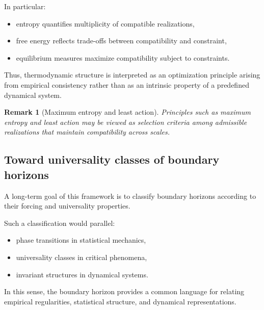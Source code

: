\documentclass[11pt]{article}
\newtheorem{remark}{Remark}
\begin{document}
In particular:
\begin{itemize}
  \item entropy quantifies multiplicity of compatible realizations,
  \item free energy reflects trade-offs between compatibility and constraint,
  \item equilibrium measures maximize compatibility subject to constraints.
\end{itemize}

Thus, thermodynamic structure is interpreted as an optimization principle
arising from empirical consistency rather than as an intrinsic property of
a predefined dynamical system.

\begin{remark}[Maximum entropy and least action]
Principles such as maximum entropy and least action may be viewed as
selection criteria among admissible realizations that maintain compatibility
across scales.
\end{remark}

\subsection{Toward universality classes of boundary horizons}

A long-term goal of this framework is to classify boundary horizons according
to their forcing and universality properties.

Such a classification would parallel:
\begin{itemize}
  \item phase transitions in statistical mechanics,
  \item universality classes in critical phenomena,
  \item invariant structures in dynamical systems.
\end{itemize}

In this sense, the boundary horizon provides a common language for relating
empirical regularities, statistical structure, and dynamical representations.

%
%
%
\end{document}

